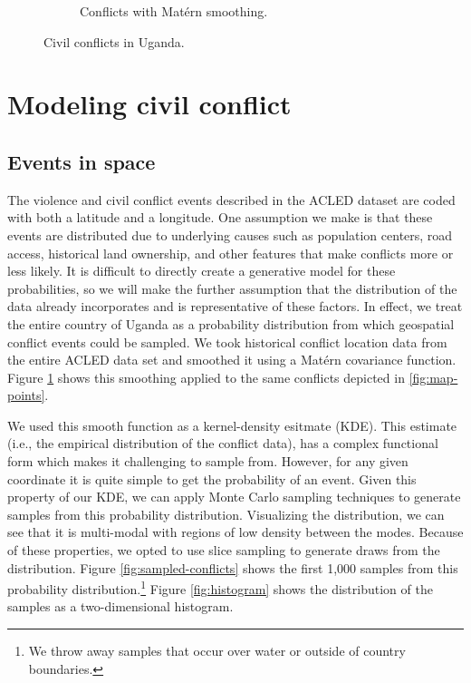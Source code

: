 \documentclass{article} %
\begin{document}
\begin{figure}
\begin{subfigure}[b]{0.5\textwidth}
    \caption{Conflicts with Mat\'{e}rn smoothing.}
    \label{fig:map-smoothed}
  \end{subfigure}
  \caption{Civil conflicts in Uganda.}
  \label{fig:map}
\end{figure}


\section{Modeling civil conflict}

\subsection{Events in space}

The violence and civil conflict events described in the ACLED dataset are coded with both a latitude and a longitude. One assumption we make is that these events are distributed due to underlying causes such as population centers, road access, historical land ownership, and other features that make conflicts more or less likely. It is difficult to directly create a generative model for these probabilities, so we will make the further assumption that the distribution of the data already incorporates and is representative of these factors. In effect, we treat the entire country of Uganda as a probability distribution from which geospatial conflict events could be sampled.  We took historical conflict location data from the entire ACLED data set and smoothed it using a Mat\'{e}rn covariance function.  Figure \ref{fig:map-smoothed} shows this smoothing applied to the same conflicts depicted in \ref{fig:map-points}.

We used this smooth function as a kernel-density esitmate (KDE). This estimate (i.e., the empirical distribution of the conflict data), has a complex functional form which makes it challenging to sample from. However, for any given coordinate it is quite simple to get the probability of an event. Given this property of our KDE, we can apply Monte Carlo sampling techniques to generate samples from this probability distribution. Visualizing the distribution, we can see that it is multi-modal with regions of low density between the modes. Because of these properties, we opted to use slice sampling to generate draws from the distribution. Figure \ref{fig:sampled-conflicts} shows the first 1,000 samples from this probability distribution.\footnote{We throw away samples that occur over water or outside of country boundaries.} Figure \ref{fig:histogram} shows the distribution of the samples as a two-dimensional histogram.
\end{document}
